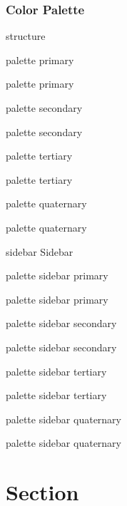 \begin{frame}\frametitle{Color Palette}

\textcolor{structure}{structure}

\begin{minipage}{10em}
	\begin{beamercolorbox}{palette primary}
	\strut palette primary
	\end{beamercolorbox}

	\begin{beamercolorbox}{palette secondary}
	\strut palette secondary
	\end{beamercolorbox}

	\begin{beamercolorbox}{palette tertiary}
	\strut palette tertiary
	\end{beamercolorbox}

	\begin{beamercolorbox}{palette quaternary}
	\strut palette quaternary
	\end{beamercolorbox}
\end{minipage}

\begin{minipage}{12em}
\small
\begin{beamercolorbox}{sidebar}
	Sidebar

	\begin{beamercolorbox}{palette sidebar primary}
	\strut palette sidebar primary
	\end{beamercolorbox}

	\begin{beamercolorbox}{palette sidebar secondary}
	\strut palette sidebar secondary
	\end{beamercolorbox}

	\begin{beamercolorbox}{palette sidebar tertiary}
	\strut palette sidebar tertiary
	\end{beamercolorbox}

	\begin{beamercolorbox}{palette sidebar quaternary}
	\strut palette sidebar quaternary
	\end{beamercolorbox}
\end{beamercolorbox}
\end{minipage}
\end{frame}


\section{Section}
\begin{frame}\sectionpage\end{frame}


